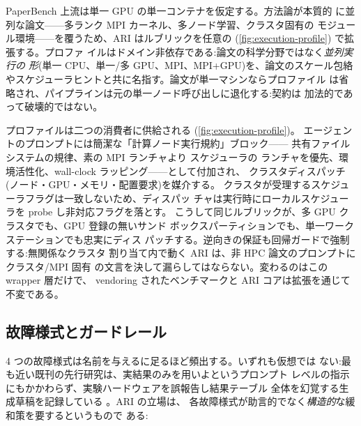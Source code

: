 PaperBench 上流は単一 GPU の単一コンテナを仮定する。方法論が本質的
に並列な論文——多ランク MPI カーネル、多ノード学習、クラスタ固有の
モジュール環境——を覆うため、ARI はルブリックを任意の (\cref{fig:execution-profile}) で拡張する。プロファ
イルはドメイン非依存である:論文の科学分野ではなく\emph{並列実行の
形}(単一 CPU、単一/多 GPU、MPI、MPI+GPU)を、論文のスケール包絡
やスケジューラヒントと共に名指す。論文が単一マシンならプロファイル
は省略され、パイプラインは元の単一ノード呼び出しに退化する:契約は
加法的であって破壊的ではない。

プロファイルは二つの消費者に供給される (\cref{fig:execution-profile})。
エージェントのプロンプトには簡潔な「計算ノード実行規約」ブロック——
共有ファイルシステムの規律、素の MPI ランチャより スケジューラの
ランチャを優先、環境活性化、wall-clock ラッピング——として付加され、
クラスタディスパッチ(ノード・GPU・メモリ・配置要求)を媒介する。
クラスタが受理するスケジューラフラグは一致しないため、ディスパッ
チャは実行時にローカルスケジューラを probe し非対応フラグを落とす。
こうして同じルブリックが、多 GPU クラスタでも、GPU 登録の無いサンド
ボックスパーティションでも、単一ワークステーションでも忠実にディス
パッチする。逆向きの保証も回帰ガードで強制する:無関係なクラスタ
割り当て内で動く ARI は、非 HPC 論文のプロンプトにクラスタ/MPI 固有
の文言を決して漏らしてはならない。変わるのはこの wrapper 層だけで、
vendoring されたベンチマークと ARI コアは拡張を通じて不変である。

\subsection{故障様式とガードレール}\label{sec:paper:failures}

4 つの故障様式は名前を与えるに足るほど頻出する。いずれも仮想では
ない:最も近い既刊の先行研究は、実結果のみを用いよというプロンプト
レベルの指示にもかかわらず、実験ハードウェアを誤報告し結果テーブル
全体を幻覚する生成草稿を記録している \cite{lu2024ai}。ARI の立場は、
各故障様式が助言的でなく\emph{構造的}な緩和策を要するというもので
ある:


